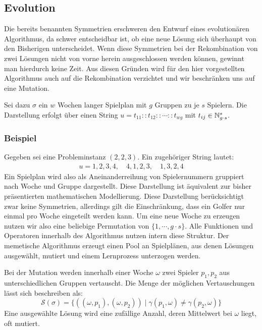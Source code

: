 \subsection{Evolution}
Die bereits benannten Symmetrien erschweren den Entwurf eines evolutionären Algorithmus, da schwer entscheidbar ist, ob eine neue Lösung sich überhaupt von den Bisherigen
unterscheidet.
Wenn diese Symmetrien bei der Rekombination von zwei Lösungen nicht von vorne herein ausgeschlossen werden können, gewinnt man hierdurch keine Zeit. 
Aus diesen Gründen wird für den hier vorgestellten Algorithmus auch auf die Rekombination verzichtet und wir beschränken uns auf eine Mutation. 

Sei dazu $\sigma$ ein $w$ Wochen langer Spielplan mit $g$ Gruppen zu je $s$ Spielern. Die Darstellung erfolgt über einen String\label{Lösungsstring} $u = t_{11} :: t_{12} :: \cdots :: t_{wg}$ mit $t_{ij} \in \mathbb{N}_{g \cdot s}^s$.

\subsubsection{Beispiel}
Gegeben sei eine Probleminstanz $(2, 2, 3)$. Ein zugehöriger String lautet:
\begin{equation}
\begin{split} 
  u = 1, 2, 3, 4,\quad 4, 1, 2, 3,\quad 1, 3, 2, 4
\end{split}
\end{equation}
Ein Spielplan wird also als Aneinanderreihung von Spielernummern gruppiert nach Woche und Gruppe dargestellt. Diese Darstellung ist äquivalent zur bisher präsentierten mathematischen Modellierung.
Diese Darstellung berücksichtigt zwar keine Symmetrien, allerdings gilt die Einschränkung, dass ein Golfer nur einmal pro Woche eingeteilt werden kann. 
Um eine neue Woche zu erzeugen nutzen wir also eine beliebige Permutation von $\{ 1, \cdots, g \cdot s\}$. Alle Funktionen und Operatoren innerhalb des Algorithmus nutzen intern diese Struktur. 
Der memetische Algorithmus erzeugt einen Pool an Spielplänen, aus denen Lösungen ausgewählt, mutiert und einem Lernprozess unterzogen werden.

Bei der Mutation werden innerhalb einer Woche $\omega$ zwei Spieler $p_1, p_2$ aus unterschiedlichen Gruppen vertauscht. Die Menge der möglichen Vertauschungen lässt sich beschreiben als:
\begin{equation}
  \mathcal{S}(\sigma) = \{ ((\omega, p_1), (\omega, p_2)) \;|\; \gamma(p_1, \omega) \neq \gamma(p_2, \omega) \}
\end{equation}
Eine ausgewählte Lösung wird eine zufällige Anzahl, deren Mittelwert bei $\omega$ liegt, oft mutiert.

